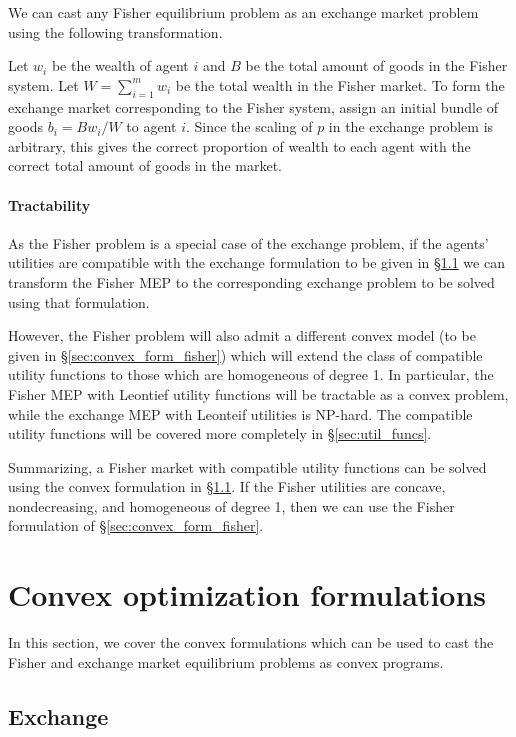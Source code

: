 \documentclass[12pt]{article}
\begin{document}
We can cast any Fisher equilibrium problem as an exchange market problem using
the following transformation.

Let $w_i$ be the wealth of agent $i$ and $B$ be the total amount of goods in
the Fisher system. Let $W = \sum_{i=1}^m w_i$ be the total wealth in the Fisher
market. To form the exchange market corresponding to the Fisher system, assign
an initial bundle of goods $b_i = B w_i/W$ to agent $i$. Since the scaling of
$p$ in the exchange problem is arbitrary, this gives the correct proportion of
wealth to each agent with the correct total amount of goods in the market.


\paragraph{Tractability}

As the Fisher problem is a special case of the exchange problem, if the agents'
utilities are compatible with the exchange formulation to be given in
\S\ref{sec:convex_form_exchange} we can transform the Fisher MEP to the
corresponding exchange problem to be solved using that formulation.

However, the Fisher problem will also admit a different convex model (to be
given in \S\ref{sec:convex_form_fisher}) which will extend the class of
compatible utility functions to those which are homogeneous of degree 1.
In particular, the Fisher MEP with
Leontief utility functions will be tractable as a convex problem, while the
exchange MEP with Leonteif utilities is NP-hard. The compatible utility
functions will be covered more completely in \S\ref{sec:util_funcs}.

Summarizing, a Fisher market with compatible utility functions can be solved
using the convex formulation in \S\ref{sec:convex_form_exchange}. If the Fisher
utilities are concave, nondecreasing, and homogeneous of degree 1, then we can
use the Fisher formulation of \S\ref{sec:convex_form_fisher}.


\section{Convex optimization formulations}
\label{sec:convex_form}
In this section, we cover the convex formulations which can be used to cast
the Fisher and exchange market equilibrium problems as convex programs.

\subsection{Exchange}
\label{sec:convex_form_exchange}
\end{document}
